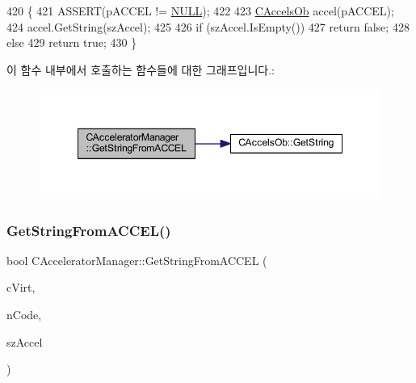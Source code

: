\begin{DoxyCode}
420 \{
421   ASSERT(pACCEL != \mbox{\hyperlink{getopt1_8c_a070d2ce7b6bb7e5c05602aa8c308d0c4}{NULL}});
422   
423   \mbox{\hyperlink{class_c_accels_ob}{CAccelsOb}} accel(pACCEL);
424   accel.GetString(szAccel);
425 
426   \textcolor{keywordflow}{if} (szAccel.IsEmpty())
427     \textcolor{keywordflow}{return} \textcolor{keyword}{false};
428   \textcolor{keywordflow}{else}
429     \textcolor{keywordflow}{return} \textcolor{keyword}{true};
430 \}
\end{DoxyCode}
이 함수 내부에서 호출하는 함수들에 대한 그래프입니다.\+:
\nopagebreak
\begin{figure}[H]
\begin{center}
\leavevmode
\includegraphics[width=348pt]{class_c_accelerator_manager_a5e861b03f3647e8c4998c49ccd4d8928_cgraph}
\end{center}
\end{figure}
\mbox{\label{class_c_accelerator_manager_adf91477de6b9df320930786c9755b0eb}} 
\subsubsection{\texorpdfstring{Get\+String\+From\+A\+C\+C\+E\+L()}{GetStringFromACCEL()}\hspace{0.1cm}{\footnotesize\ttfamily [2/2]}}
{\footnotesize\ttfamily bool C\+Accelerator\+Manager\+::\+Get\+String\+From\+A\+C\+C\+EL (\begin{DoxyParamCaption}\item[{B\+Y\+TE}]{c\+Virt,  }\item[{W\+O\+RD}]{n\+Code,  }\item[{C\+String \&}]{sz\+Accel }\end{DoxyParamCaption})}



